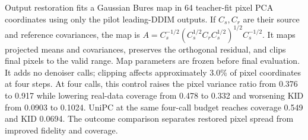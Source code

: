 Output restoration fits a Gaussian Bures map in 64 teacher-fit pixel PCA
coordinates using only the pilot leading-DDIM outputs. If $C_s,C_r$ are
their source and reference covariances, the map is
$A=C_s^{-1/2}(C_s^{1/2}C_rC_s^{1/2})^{1/2}C_s^{-1/2}$.
It maps projected means and covariances, preserves the orthogonal residual,
and clips final pixels to the valid range. Map parameters are frozen before
final evaluation. It adds no denoiser calls; clipping affects approximately
3.0\% of pixel coordinates at four steps. At four calls, this control raises the pixel variance ratio from 0.376 to
0.917 while lowering real-data coverage from 0.478 to 0.332 and worsening
KID from 0.0903 to 0.1024. UniPC at the same four-call budget reaches
coverage 0.549 and KID 0.0694. The outcome comparison separates restored
pixel spread from improved fidelity and coverage.

